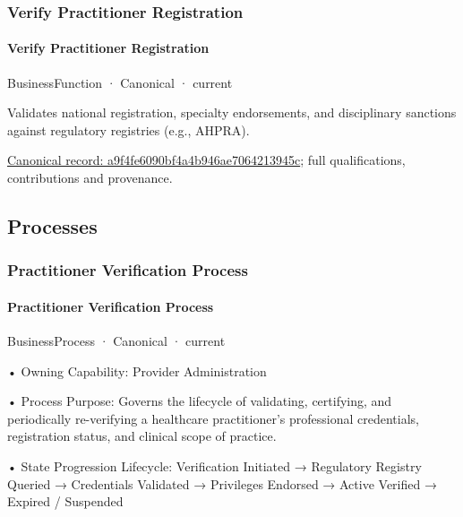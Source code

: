 \subsubsection{Verify Practitioner Registration}

\paragraph{Verify Practitioner Registration}

\label{element:a9f4fe6090bf4a4b946ae7064213945c}
{\small BusinessFunction · Canonical · current}\par

Validates national registration, specialty endorsements, and disciplinary sanctions against regulatory registries (e.g., AHPRA).


{\footnotesize \href{../../../../continuum/business/business-function/a9f4fe6090bf4a4b946ae7064213945c.md}{Canonical record: a9f4fe6090bf4a4b946ae7064213945c}; full qualifications, contributions and provenance.}\par
\subsection{Processes}

\subsubsection{Practitioner Verification Process}

\paragraph{Practitioner Verification Process}

\label{element:32a3e1f948474d3aa77ca71bfa515f58}
{\small BusinessProcess · Canonical · current}\par

•
Owning Capability: Provider Administration



•
Process Purpose: Governs the lifecycle of validating, certifying, and periodically re-verifying a healthcare practitioner's professional credentials, registration status, and clinical scope of practice.



•
State Progression Lifecycle: Verification Initiated → Regulatory Registry Queried → Credentials Validated → Privileges Endorsed → Active Verified → Expired / Suspended



